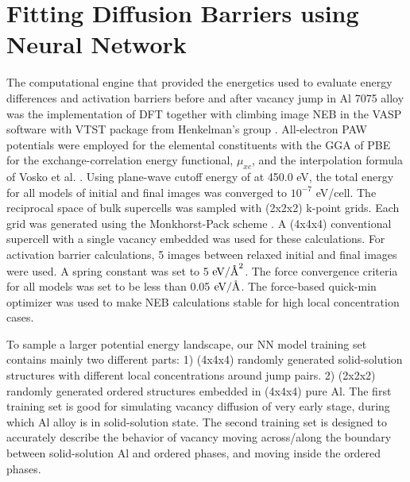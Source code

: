 \section{Fitting Diffusion Barriers using Neural Network}
\label{Chap:Al/Vac:section:NN}

The computational engine that provided the energetics used to evaluate energy differences and activation barriers before and after vacancy jump in Al 7075 alloy was the implementation of \ac{DFT} together with climbing image \acf{NEB} in the \ac{VASP} software with VTST package from Henkelman's group \cite{henkelman2000climbing,henkelman2000improved}. All-electron \ac{PAW} potentials were employed for the elemental constituents with the \ac{GGA} of \ac{PBE} for the exchange-correlation energy functional, $\mu_{xc}$, and the interpolation formula of Vosko et al. \cite{vosko1980accurate}. Using plane-wave cutoff energy of at 450.0 eV, the total energy for all models of initial and final images was converged to $10^{−7}$ eV/cell. The reciprocal space of bulk supercells was sampled with (2x2x2) k-point grids. Each grid was generated using the Monkhorst-Pack scheme \cite{monkhorst1976special}. A (4x4x4) conventional supercell with a single vacancy embedded was used for these calculations. For activation barrier calculations, 5 images between relaxed initial and final images were used. A spring constant was set to 5 $\text{eV}/\mbox{\normalfont\AA}^2$. The force convergence criteria for all models was set to be less than 0.05 $\text{eV}/\mbox{\normalfont\AA}$. The force-based quick-min optimizer was used to make \ac{NEB} calculations stable for high local concentration cases. \cite{sheppard2008optimization}

To sample a larger potential energy landscape, our \ac{NN} model training set contains mainly two different parts: 1) (4x4x4) randomly generated solid-solution structures with different local concentrations around jump pairs. 2) (2x2x2) randomly generated ordered structures embedded in (4x4x4) pure Al. The first training set is good for simulating vacancy diffusion of very early stage, during which Al alloy is in solid-solution state. The second training set is designed to accurately describe the behavior of vacancy moving across/along the boundary between solid-solution Al and ordered phases, and moving inside the ordered phases.


